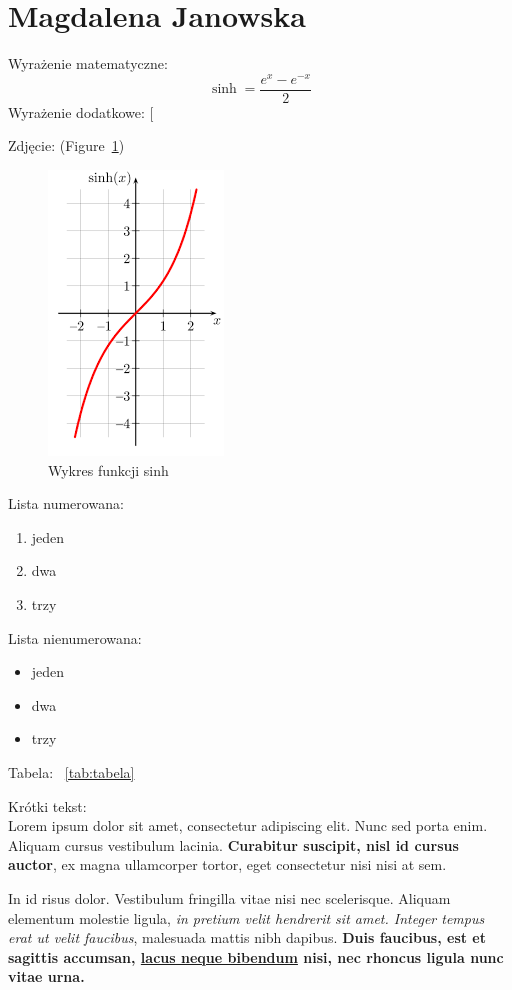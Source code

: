 \section{Magdalena Janowska}
 Wyrażenie matematyczne:
\[\sinh=\frac{e^{x}-e^{-x}}{2}\]
 Wyrażenie dodatkowe:
[\]

 Zdjęcie: (Figure~\ref{fig:wykres})
\begin{figure} [htbp]
    \centering
    \includegraphics[scale=0.8]{pictures/wykres.png}
    \caption{Wykres funkcji sinh}
    \label{fig:wykres}
\end{figure}
 
 Lista numerowana:
\begin{enumerate}
    \item jeden
    \item dwa
    \item trzy
\end{enumerate}

 Lista nienumerowana:
\begin{itemize}
    \item jeden
    \item dwa
    \item trzy
\end{itemize}
 

 Tabela: ~\ref{tab:tabela}


 Krótki tekst:\\
 
Lorem ipsum dolor sit amet, consectetur adipiscing elit. Nunc sed porta enim. Aliquam cursus vestibulum lacinia. \textbf{Curabitur suscipit, nisl id cursus auctor}, ex magna ullamcorper tortor, eget consectetur nisi nisi at sem.

In id risus dolor. Vestibulum fringilla vitae nisi nec scelerisque. Aliquam elementum molestie ligula, \emph{ in pretium velit hendrerit sit amet. Integer tempus erat ut velit faucibus}, malesuada mattis nibh dapibus. \textbf{Duis faucibus, est et sagittis accumsan,  \underline{lacus neque bibendum} nisi, nec rhoncus ligula nunc vitae urna.} 

    
    
